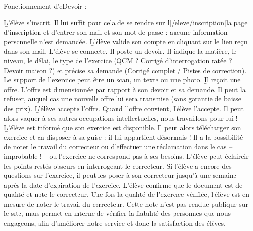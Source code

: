 ﻿Fonctionnement d'\b{eDevoir} :
\begin{enumerate}
	\li \b{L'élève s'inscrit.} Il lui suffit pour cela de se rendre sur \l[/eleve/inscription]{la page d'inscription} et d'entrer son mail et son mot de passe : aucune information personnelle n'est demandée.
	\li \b{L'élève valide son compte en cliquant sur le lien reçu dans son mail.}
	\li \b{L'élève se connecte.}
	\li \b{Il poste un devoir.} Il indique la matière, le niveau, le délai, le type de l'exercice (QCM ? Corrigé d'interrogation ratée ? Devoir maison ?) et précise sa demande (Corrigé complet / Pistes de correction). Le support de l'exercice peut être un scan, un texte ou une photo.
	\li \b{Il reçoit une offre.} L'offre est dimensionnée par rapport à son devoir et sa demande. Il peut la refuser, auquel cas une nouvelle offre lui sera transmise (sans garantie de baisse des prix).
	\li \b{L'élève accepte l'offre.} Quand l'offre convient, l'élève l'accepte. Il peut alors vaquer à ses autres occupations intellectuelles, nous travaillons pour lui !
	\li \b{L'élève est informé que son exercice est disponible.} Il peut alors télécharger son exercice et en disposer à sa guise : il lui appartient désormais ! Il a la possibilité de noter le travail du correcteur ou d'effectuer une réclamation dans le cas -- improbable ! -- ou l'exercice ne correspond pas à ses besoins.
	\li \b{L'élève peut éclaircir les points restés obscurs en interrogeant le correcteur.} Si l'élève a encore des questions sur l'exercice, il peut les poser à son correcteur jusqu'à une semaine après la date d'expiration de l'exercice.
	\li \b{L'élève confirme que le document est de qualité et note le correcteur.} Une fois la qualité de l'exercice vérifiée, l'élève est en mesure de noter le travail du correcteur. Cette note n'est pas rendue publique sur le site, mais permet en interne de vérifier la fiabilité des personnes que nous engageons, afin d'améliorer notre service et donc la satisfaction des élèves.
\end{enumerate}